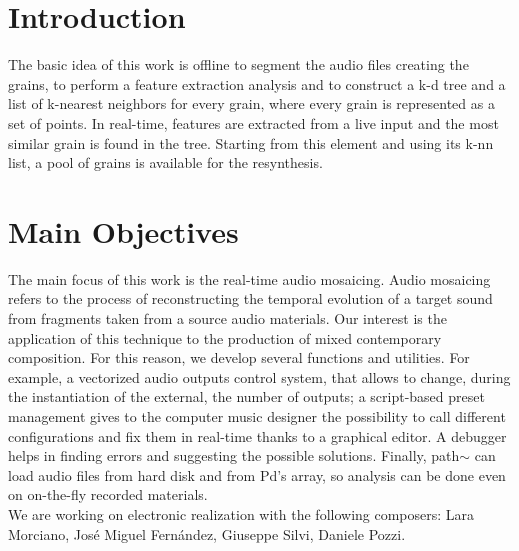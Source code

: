 \documentclass[a0,portrait]{a0poster}
\begin{document}
\begin{multicols}{2}

\section*{Introduction}
The basic idea of this work is offline to segment the audio files creating the grains, to perform a feature extraction analysis and to construct a k-d tree and a list of k-nearest neighbors for every grain, where every grain is represented as a set of points. In real-time, features are extracted from a live input and the most similar grain is found in the tree. Starting from this element and using its k-nn list, a pool of grains is available for the resynthesis.

\color{DarkSlateGray}

\section*{Main Objectives}
The main focus of this work is the real-time audio mosaicing. Audio mosaicing refers to the process of reconstructing the temporal evolution of a target sound from fragments taken from a source audio materials. Our interest is the application of this technique to the production of mixed contemporary composition. For this reason, we develop several functions and utilities. For example, a vectorized audio outputs control system, that allows to change, during the instantiation of the external, the number of outputs; a script-based preset management gives to the computer music designer the possibility to call different configurations and fix them in real-time thanks to a graphical editor. A debugger helps in finding errors and suggesting the possible solutions. Finally, path$\sim$ can load audio files from hard disk and from Pd's array, so analysis can be done even on on-the-fly recorded materials. \\
We are working on electronic realization with the following composers: Lara Morciano, Jos\'e Miguel Fern\'andez, Giuseppe Silvi, Daniele Pozzi.

\vspace{2cm}

\begin{figure}[H]
\centering
\begin{tikzpicture}[
	block/.style={
		node distance = 5cm,
		rectangle,
		draw,
		fill=supercolor!10,
		inner sep=5pt,
		text width=10cm,
		text badly centered,
		minimum height=2cm,
		font=\bfseries\sffamily},
	cloud/.style={
		node distance = 5cm, 
		rectangle,
		draw,
		inner sep=5pt,
		text width=10cm,
		text badly centered,
		minimum height=2cm,
		font=\bfseries\sffamily},	
	line/.style={
	draw,
	font=\small\sffamily}]


\end{tikzpicture}
\end{figure}
\end{multicols}
\end{document}
